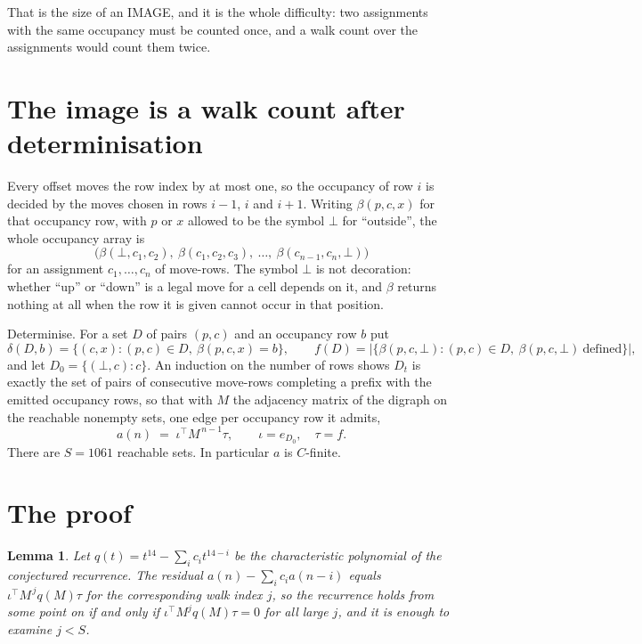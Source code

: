 \documentclass[11pt,a4paper]{article}
\theoremstyle{plain}
\newtheorem{lemma}[theorem]{Lemma}
\theoremstyle{definition}
\begin{document}
That is the size of an IMAGE, and it is the whole difficulty: two assignments with the same
occupancy must be counted once, and a walk count over the assignments would count them twice.

\section{The image is a walk count after determinisation}

Every offset moves the row index by at most one, so the occupancy of row $i$ is decided by the
moves chosen in rows $i-1$, $i$ and $i+1$. Writing $\beta(p,c,x)$ for that occupancy row, with
$p$ or $x$ allowed to be the symbol $\bot$ for ``outside'', the whole occupancy array is
\[
\bigl(\beta(\bot,c_1,c_2),\ \beta(c_1,c_2,c_3),\ \dots,\ \beta(c_{n-1},c_n,\bot)\bigr)
\]
for an assignment $c_1,\dots,c_n$ of move-rows. The symbol $\bot$ is not decoration: whether
``up'' or ``down'' is a legal move for a cell depends on it, and $\beta$ returns nothing at all
when the row it is given cannot occur in that position.

Determinise. For a set $D$ of pairs $(p,c)$ and an occupancy row $b$ put
\[
\delta(D,b)=\{(c,x):(p,c)\in D,\ \beta(p,c,x)=b\},\qquad
f(D)=\bigl|\{\beta(p,c,\bot):(p,c)\in D,\ \beta(p,c,\bot)\ \text{defined}\}\bigr| ,
\]
and let $D_0=\{(\bot,c):c\}$. An induction on the number of rows shows $D_t$ is exactly the
set of pairs of consecutive move-rows completing a prefix with the emitted occupancy rows, so
that with $M$ the adjacency matrix of the digraph on the reachable nonempty sets, one edge per
occupancy row it admits,
\[
a(n)\;=\;\iota^{\!\top}M^{\,n-1}\tau,\qquad \iota=e_{D_0},\quad \tau=f .
\]
There are $S=1061$ reachable sets. In particular $a$ is $C$-finite.

\section{The proof}

\begin{lemma}\label{lem:crit}
Let $q(t)=t^{14}-\sum_i c_it^{14-i}$ be the characteristic polynomial of the
conjectured recurrence. The residual $a(n)-\sum_ic_ia(n-i)$ equals
$\iota^{\!\top}M^{\,j}q(M)\tau$ for the corresponding walk index $j$, so the recurrence
holds from some point on if and only if $\iota^{\!\top}M^{j}q(M)\tau=0$ for all large $j$,
and it is enough to examine $j<S$.
\end{lemma}
\end{document}
